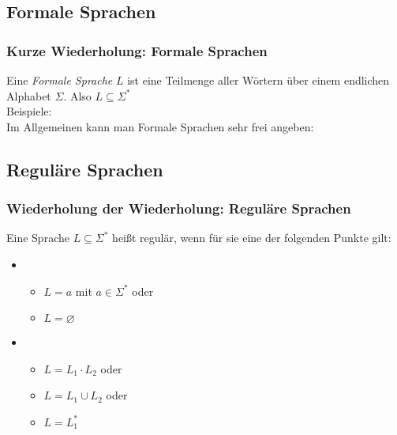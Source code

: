 \documentclass{beamer}
\begin{document}
{\subsection{Formale Sprachen}
\begin{frame}
	\frametitle{Kurze Wiederholung: Formale Sprachen}
	Eine \emph{Formale Sprache} $L$ ist eine Teilmenge aller Wörtern über einem endlichen Alphabet $\Sigma$. Also $L \subseteq \Sigma^*$\\[0.3cm]
	Beispiele:
	\\[0.2cm]
Im Allgemeinen kann man Formale Sprachen sehr frei angeben: 
\end{frame}
\subsection{Reguläre Sprachen}
\begin{frame}
 \frametitle{Wiederholung der Wiederholung: Reguläre Sprachen}
        Eine Sprache \(L\subseteq\Sigma^*\) heißt regulär, wenn für sie eine der folgenden Punkte gilt:

\begin{itemize}
\item \begin{itemize}Verankerung
\item \(L = {a}\) mit \(a\in\Sigma^*\) oder
\item \(L = \varnothing \)
\end{itemize}
\item \begin{itemize}Induktion: Seien \(L_1\), \(L_2\) reguläre Sprachen
      \item \(L = L_1 \cdot L_2\) oder
      \item \(L = L_1 \cup L_2\) oder
      \item \(L = L_1^*\)
      \end{itemize}


\end{itemize}
\end{frame}}
\end{document}
